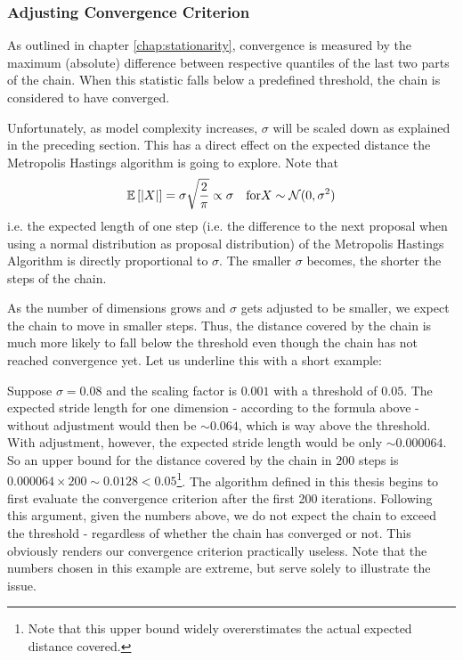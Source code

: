 \subsubsection{Adjusting Convergence Criterion}
As outlined in chapter \ref{chap:stationarity}, convergence is measured by the maximum (absolute) difference between respective quantiles of the last two parts of the chain. When this statistic falls below a predefined threshold, the chain is considered to have converged. 

Unfortunately, as model complexity increases, $\sigma$ will be scaled down as explained in the preceding section. This has a direct effect on the expected distance the Metropolis Hastings algorithm is going to explore. Note that
\begin{align}
  \mathbb{E}\left[ |X| \right] = \sigma \sqrt{\frac{2}{\pi}} \propto \sigma 
  \quad \text{for} X \sim \mathcal{N}(0, \sigma^2)
\end{align}
i.e. the expected length of one step (i.e. the difference to the next proposal when using a normal distribution as proposal distribution) of the Metropolis Hastings Algorithm is directly proportional to $\sigma$. The smaller $\sigma$ becomes, the shorter the steps of the chain. 

As the number of dimensions grows and $\sigma$ gets adjusted to be smaller, we expect the chain to move in smaller steps. Thus, the distance covered by the chain is much more likely to fall below the threshold even though the chain has not reached convergence yet. Let us underline this with a short example:

Suppose $\sigma = 0.08$ and the scaling factor is $0.001$ with a threshold of $0.05$. The expected stride length for one dimension - according to the formula above - without adjustment would then be $\sim 0.064$, which is way above the threshold. With adjustment, however, the expected stride length would be only $\sim 0.000064$. So an upper bound for the distance covered by the chain in $200$ steps is $0.000064 \times 200 \sim 0.0128 < 0.05$\footnote{Note that this upper bound widely overerstimates the actual expected distance covered.}. The algorithm defined in this thesis begins to first evaluate the convergence criterion after the first 200 iterations. Following this argument, given the numbers above, we do not expect the chain to exceed the threshold - regardless of whether the chain has converged or not. This obviously renders our convergence criterion practically useless. Note that the numbers chosen in this example are extreme, but serve solely to illustrate the issue. 

